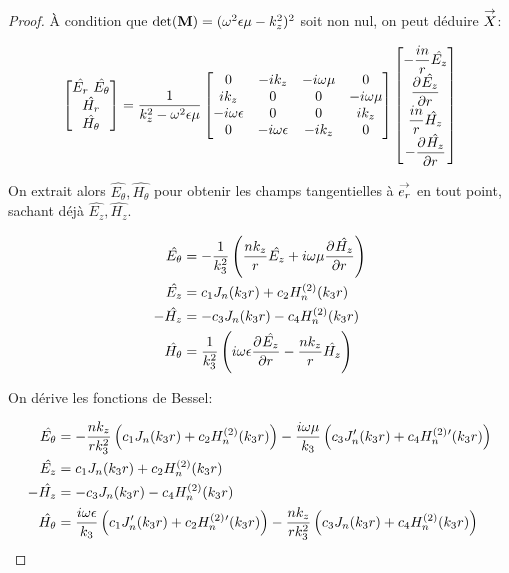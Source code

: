 \begin{proof}
        À condition que \(\det(\mat{M}) = (\w^2\eps\mu-k_z^2)^2\) soit non nul, on peut déduire \(\vect{X}\):

        \begin{equation}
            \begin{bmatrix}
                \hat{E_r}\
                \hat{E_\theta}\\
                \hat{H_r}\\
                \hat{H_\theta}
            \end{bmatrix} =
            \frac{1}{k_z^2 - \w^2\eps\mu}
            \begin{bmatrix}
            0 & -ik_z & -i\w\mu & 0 
            \\
            ik_z & 0 & 0 & -i\w\mu
            \\
            -i\w\eps & 0 & 0 & ik_z
            \\
            0 & -i\w\eps & -ik_z & 0
            \end{bmatrix}
            \begin{bmatrix}
                -\frac{in}{r}\hat{E_z}\\
                \ddr{r}{\hat{E_z}}\\
                \frac{in}{r}\hat{H_z}\\
                -\ddr{r}{\hat{H_z}}
            \end{bmatrix}
        \end{equation}

        On extrait alors \(\hat{E_\theta}, \hat{H_\theta}\) pour obtenir les champs tangentielles à \(\vect{e_r}\) en tout point, sachant déjà \(\hat{E_z}, \hat{H_z}\).

        \begin{align}
            \hat{E_\theta} &= -\frac{1}{k_3^2}\left(\frac{nk_z}{r}\hat{E_z} + i\w\mu\ddr{r}{\hat{H_z}}\right)
            \\
            \hat{E_z} &= c_1 J_n(k_3 r) + c_2 H_n^{(2)}(k_3 r)
            \\
            -\hat{H_z} &= -c_3 J_n(k_3 r) - c_4 H_n^{(2)}(k_3 r)
            \\
            \hat{H_\theta} &= \frac{1}{k_3^2}\left(i\w\eps\ddr{r}{\hat{E_z}} - \frac{nk_z}{r}\hat{H_z}\right)
        \end{align}

        On dérive les fonctions de Bessel:

       \begin{align}
            \hat{E_\theta} &= -\frac{nk_z}{rk_3^2}\left(c_1J_n(k_3r) + c_2 H_n^{(2)}(k_3r)\right) - \frac{i\w\mu}{k_3}\left(c_3J_n'(k_3r) + c_4 H_n^{(2)}{}'(k_3r)\right)
            \\
            \hat{E_z} &= c_1 J_n(k_3 r) + c_2 H_n^{(2)}(k_3 r)
            \\
            -\hat{H_z} &= -c_3 J_n(k_3 r) - c_4 H_n^{(2)}(k_3 r)
            \\
            \hat{H_\theta} &= \frac{i\w\eps}{k_3}\left(c_1J_n'(k_3r) + c_2 H_n^{(2)}{}'(k_3r)\right) - \frac{nk_z}{rk_3^2}\left(c_3J_n(k_3r) + c_4 H_n^{(2)}(k_3r)\right)
        \end{align}


\end{proof}
